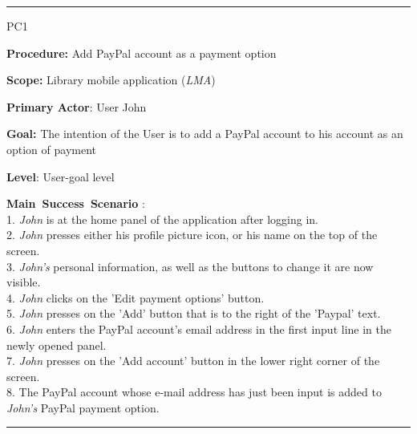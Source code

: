 \vspace{0.5cm}
\hrule
\begin{lyxlist}{PC1}
\small{
\item [\textbf{Procedure:}] Add PayPal account as a payment option
\item [\textbf{Scope:}] Library mobile application (\emph{LMA})
\item [\textbf{Primary Actor}:] User John
\item [\textbf{Goal:}] The intention of the User is to add a PayPal account to
his account as an option of payment
\item [\textbf{Level}:] User-goal level
\item [\textbf{Main~Success~Scenario}]:\\
1. \emph{John} is at the home panel of the application after logging in.\\
2. \emph{John} presses either his profile picture icon, or his name on the
top of the screen.\\
3. \emph{John's} personal information, as well as the buttons to change it are
now visible.\\
4. \emph{John} clicks on the 'Edit payment options' button.\\
5. \emph{John} presses on the 'Add' button that is to the right of the
'Paypal' text.\\
6. \emph{John} enters the PayPal account's email address in the
first input line in the newly opened panel. \\
7. \emph{John} presses on the 'Add account' button in the lower right corner of
the screen. \\
8. The PayPal account whose e-mail address has just been input is added to
\emph{John's} PayPal payment option. \\

}

\end{lyxlist}
\hrule



